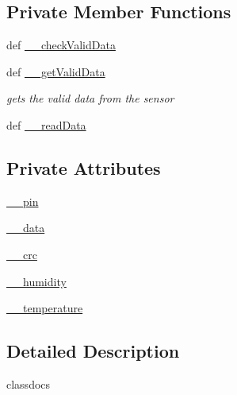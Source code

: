 \subsection*{Private Member Functions}
\begin{DoxyCompactItemize}
\item 
def \hyperlink{classlibsensorPy_1_1concretesensor_1_1dht11Temperature_1_1DHT11Temperature_adec17919d7fe391677e9e9117c8f52d3}{\+\_\+\+\_\+check\+Valid\+Data}
\item 
def \hyperlink{classlibsensorPy_1_1concretesensor_1_1dht11Temperature_1_1DHT11Temperature_a14ecdc4b2de19908a965db4058ac0210}{\+\_\+\+\_\+get\+Valid\+Data}
\begin{DoxyCompactList}\small\item\em gets the valid data from the sensor \end{DoxyCompactList}\item 
def \hyperlink{classlibsensorPy_1_1concretesensor_1_1dht11Temperature_1_1DHT11Temperature_a2dbd945dd49378436f1177b538a09459}{\+\_\+\+\_\+read\+Data}
\end{DoxyCompactItemize}
\subsection*{Private Attributes}
\begin{DoxyCompactItemize}
\item 
\hyperlink{classlibsensorPy_1_1concretesensor_1_1dht11Temperature_1_1DHT11Temperature_aaeafc0234ecde2ea71edb2cde10bcc72}{\+\_\+\+\_\+pin}
\item 
\hyperlink{classlibsensorPy_1_1concretesensor_1_1dht11Temperature_1_1DHT11Temperature_a2606abdcfef9329a6a8d8863e072a5f6}{\+\_\+\+\_\+data}
\item 
\hyperlink{classlibsensorPy_1_1concretesensor_1_1dht11Temperature_1_1DHT11Temperature_a02d1822cd5645d11e7fc18924f377ace}{\+\_\+\+\_\+crc}
\item 
\hyperlink{classlibsensorPy_1_1concretesensor_1_1dht11Temperature_1_1DHT11Temperature_a101af3374fcabaa6ba1a9ef670f1260b}{\+\_\+\+\_\+humidity}
\item 
\hyperlink{classlibsensorPy_1_1concretesensor_1_1dht11Temperature_1_1DHT11Temperature_aed45d0818f7f931b0b48176a0477e67a}{\+\_\+\+\_\+temperature}
\end{DoxyCompactItemize}


\subsection{Detailed Description}
\begin{DoxyVerb}classdocs
\end{DoxyVerb}
 

